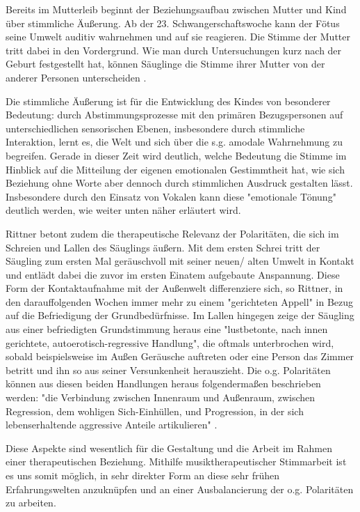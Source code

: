 Bereits im Mutterleib beginnt der Beziehungsaufbau zwischen Mutter und Kind über stimmliche Äußerung. Ab der 23. Schwangerschaftswoche kann der Fötus seine Umwelt auditiv wahrnehmen und auf sie reagieren. Die Stimme der Mutter tritt dabei in den Vordergrund. Wie man durch Untersuchungen kurz nach der Geburt festgestellt hat, können Säuglinge die Stimme ihrer Mutter von der anderer Personen unterscheiden \autocite [vgl.][22f]{noecker-ribeaupierre2004}. 

Die stimmliche Äußerung ist für die Entwicklung des Kindes von besonderer Bedeutung: durch Abstimmungsprozesse mit den primären Bezugspersonen auf unterschiedlichen sensorischen Ebenen, insbesondere durch stimmliche Interaktion, lernt es, die Welt und sich über die s.g. amodale Wahrnehmung zu begreifen. Gerade in dieser Zeit wird deutlich, welche Bedeutung die Stimme im Hinblick auf die Mitteilung der eigenen emotionalen Gestimmtheit hat, wie sich Beziehung ohne Worte aber dennoch durch stimmlichen Ausdruck gestalten lässt. Insbesondere durch den Einsatz von Vokalen kann diese "emotionale Tönung" \autocite[205]{rittner2008} deutlich werden, wie weiter unten näher erläutert wird.

Rittner \autocite [vgl.][106f.]{rittner1990} betont zudem die therapeutische Relevanz der Polaritäten, die sich im Schreien und Lallen des Säuglings äußern. Mit dem ersten Schrei tritt der Säugling zum ersten Mal geräuschvoll mit seiner neuen/ alten Umwelt in Kontakt und entlädt dabei die zuvor im ersten Einatem aufgebaute Anspannung. Diese Form der Kontaktaufnahme mit der Außenwelt differenziere sich, so Rittner, in den darauffolgenden Wochen immer mehr zu einem "gerichteten Appell" in Bezug auf die Befriedigung der Grundbedürfnisse. Im Lallen hingegen zeige der Säugling aus einer befriedigten Grundstimmung heraus eine "lustbetonte, nach innen gerichtete, autoerotisch-regressive Handlung", die oftmals unterbrochen wird, sobald beispielsweise im Außen Geräusche auftreten oder eine Person das Zimmer betritt und ihn so aus seiner Versunkenheit herauszieht. 
Die o.g. Polaritäten können aus diesen beiden Handlungen heraus folgendermaßen beschrieben werden: "die Verbindung zwischen Innenraum und Außenraum, zwischen Regression, dem wohligen Sich-Einhüllen, und Progression, in der sich lebenserhaltende aggressive Anteile artikulieren" \autocite[vgl.][106f.]{rittner1990}.

Diese Aspekte sind wesentlich für die Gestaltung und die Arbeit im Rahmen einer therapeutischen Beziehung. Mithilfe musiktherapeutischer Stimmarbeit ist es uns somit möglich, in sehr direkter Form an diese sehr frühen Erfahrungswelten anzuknüpfen und an einer Ausbalancierung der o.g. Polaritäten zu arbeiten. 

